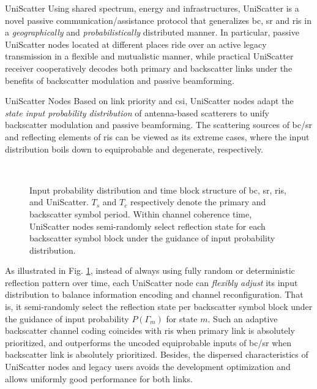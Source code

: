 \documentclass[journal]{IEEEtran}
\begin{document}
\begin{section}{UniScatter}
	Using shared spectrum, energy and infrastructures, UniScatter is a novel passive communication/assistance protocol that generalizes \gls{bc}, \gls{sr} and \gls{ris} in a \emph{geographically} and \emph{probabilistically} distributed manner.
	In particular, passive UniScatter nodes located at different places ride over an active legacy transmission in a flexible and mutualistic manner, while practical UniScatter receiver cooperatively decodes both primary and backscatter links under the benefits of backscatter modulation and passive beamforming.
	\begin{subsection}{UniScatter Nodes}
		Based on link priority and \gls{csi}, UniScatter nodes adapt the \emph{state input probability distribution} of antenna-based scatterers to unify backscatter modulation and passive beamforming.
		The scattering sources of \gls{bc}/\gls{sr} and reflecting elements of \gls{ris} can be viewed as its extreme cases, where the input distribution boils down to equiprobable and degenerate, respectively.
		\begin{figure}[!t]
			\centering
			\\
			\caption{
				Input probability distribution and time block structure of \gls{bc}, \gls{sr}, \gls{ris}, and UniScatter.
				$T_s$ and $T_c$ respectively denote the primary and backscatter symbol period.
				Within channel coherence time, UniScatter nodes semi-randomly select reflection state for each backscatter symbol block under the guidance of input probability distribution.
			}
			\label{fi:uniscatter_distribution}
		\end{figure}
		As illustrated in Fig. \ref{fi:uniscatter_distribution}, instead of always using fully random or deterministic reflection pattern over time, each UniScatter node can \emph{flexibly adjust} its input distribution to balance information encoding and channel reconfiguration.
		That is, it semi-randomly select the reflection state per backscatter symbol block under the guidance of input probability $P(\Gamma_m)$ for state $m$.
		Such an adaptive backscatter channel coding coincides with \gls{ris} when primary link is absolutely prioritized, and outperforms the uncoded equiprobable inputs of \gls{bc}/\gls{sr} when backscatter link is absolutely prioritized.
		Besides, the dispersed characteristics of UniScatter nodes and legacy users avoids the development optimization and allows uniformly good performance for both links.


\end{subsection}
\end{section}
\end{document}
